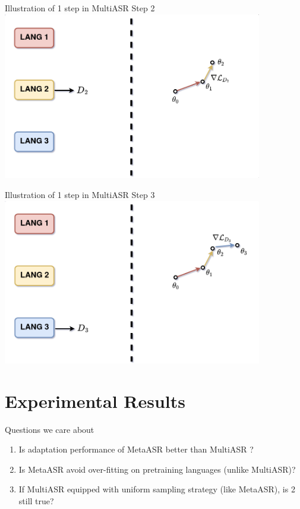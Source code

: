 \documentclass{beamer}
\begin{document}
\begin{frame}[t]{Illustration of 1 step in MultiASR}
  Step 2 
  \center \includegraphics[width=0.85\textwidth]{fig/multi_step2.png}
\end{frame}

\begin{frame}[t]{Illustration of 1 step in MultiASR}
  Step 3 
  \center \includegraphics[width=0.85\textwidth]{fig/multi_step3.png}
\end{frame}

\section{Experimental Results}
\begin{frame}[t]{Questions we care about}
  \begin{enumerate}[<+->]
    \item Is adaptation performance of MetaASR better than MultiASR ?
    \item Is MetaASR avoid over-fitting on pretraining languages (unlike MultiASR)?
    \item If MultiASR equipped with uniform sampling strategy (like MetaASR), is 2 still true?
  \end{enumerate}
\end{frame}
\end{document}
